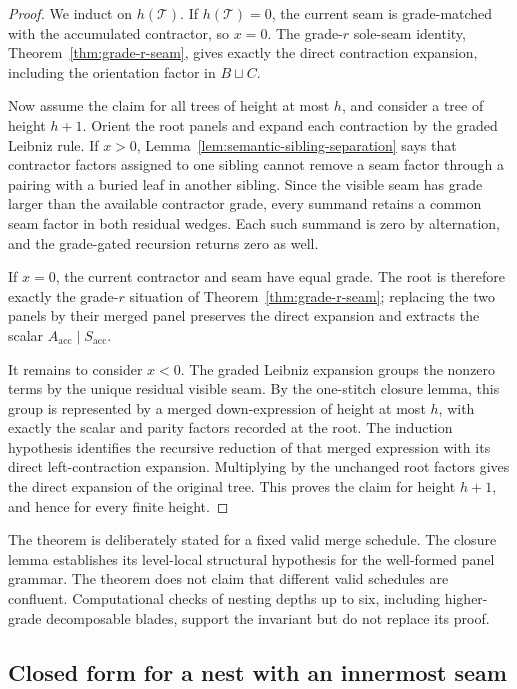 \documentclass[11pt]{article}
\begin{document}
\begin{proof}
We induct on \(h(\mathcal T)\). If \(h(\mathcal T)=0\), the current seam is
grade-matched with the accumulated contractor, so \(x=0\). The
grade-\(r\) sole-seam identity, Theorem~\ref{thm:grade-r-seam}, gives exactly
the direct contraction expansion, including the orientation factor in
\(B\sqcup C\).

Now assume the claim for all trees of height at most \(h\), and consider a
tree of height \(h+1\). Orient the root panels and expand each contraction by
the graded Leibniz rule. If \(x>0\), Lemma~\ref{lem:semantic-sibling-separation}
says that contractor factors assigned to one sibling cannot remove a seam
factor through a pairing with a buried leaf in another sibling. Since the
visible seam has grade larger than the available contractor grade, every
summand retains a common seam factor in both residual wedges. Each such
summand is zero by alternation, and the grade-gated recursion returns zero as
well.

If \(x=0\), the current contractor and seam have equal grade. The root is
therefore exactly the grade-\(r\) situation of
Theorem~\ref{thm:grade-r-seam}; replacing the two panels by their merged
panel preserves the direct expansion and extracts the scalar
\(A_{\mathrm{acc}}\mid S_{\mathrm{acc}}\).

It remains to consider \(x<0\). The graded Leibniz expansion groups the
nonzero terms by the unique residual visible seam. By the one-stitch closure
lemma, this group is represented by a merged down-expression of height at
most \(h\), with exactly the scalar and parity factors recorded at the root.
The induction hypothesis identifies the recursive reduction of that merged
expression with its direct left-contraction expansion. Multiplying by the
unchanged root factors gives the direct expansion of the original tree. This
proves the claim for height \(h+1\), and hence for every finite height.
\end{proof}

The theorem is deliberately stated for a fixed valid merge schedule. The
closure lemma establishes its level-local structural hypothesis for the
well-formed panel grammar. The theorem does not claim that different valid
schedules are confluent. Computational checks of nesting depths up to six,
including higher-grade decomposable blades, support the invariant but do not
replace its proof.

\subsection{Closed form for a nest with an innermost seam}
\end{document}
